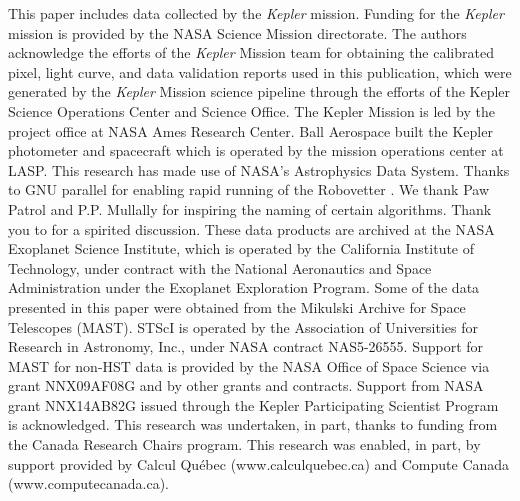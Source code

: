 \documentclass[apj,twocolappendix,numberedappendix]{emulateapj}
\renewcommand{\_}{\discretionary{\underscore}{}{\underscore}}  %
\newcommand\Kepler{\textit{Kepler}}
\begin{document}













\acknowledgments
This paper includes data collected by the \Kepler{} mission. Funding for the \Kepler{} mission is provided by the NASA Science Mission directorate. The authors acknowledge the efforts of the \Kepler{} Mission team for obtaining the calibrated pixel, light curve, and data validation reports used in this publication, which were generated by the \Kepler{} Mission science pipeline through the efforts of the Kepler Science Operations Center and Science Office. The Kepler Mission is led by the project office at NASA Ames Research Center. Ball Aerospace built the Kepler photometer and spacecraft which is operated by the mission operations center at LASP.  This research has made use of NASA's Astrophysics Data System.  Thanks to GNU parallel for enabling rapid running of the Robovetter \citep{Tange2011a}. We thank Paw Patrol and P.P. Mullally for inspiring the naming of certain algorithms. Thank you to \citet{Turbo-King2017} for a spirited discussion. These data products are archived at the NASA Exoplanet Science Institute, which is operated by the California Institute of Technology, under contract with the National Aeronautics and Space Administration under the Exoplanet Exploration Program. Some of the data presented in this paper were obtained from the Mikulski Archive for Space Telescopes (MAST). STScI is operated by the Association of Universities for Research in Astronomy, Inc., under NASA contract NAS5-26555. Support for MAST for non-HST data is provided by the NASA Office of Space Science via grant NNX09AF08G and by other grants and contracts.  Support from NASA grant NNX14AB82G issued through the Kepler Participating Scientist Program is acknowledged. This research was undertaken, in part, thanks to funding from the Canada Research Chairs program. This research was enabled, in part, by support provided by Calcul Qu\'{e}bec (www.calculquebec.ca) and Compute Canada (www.computecanada.ca). 
\end{document}
